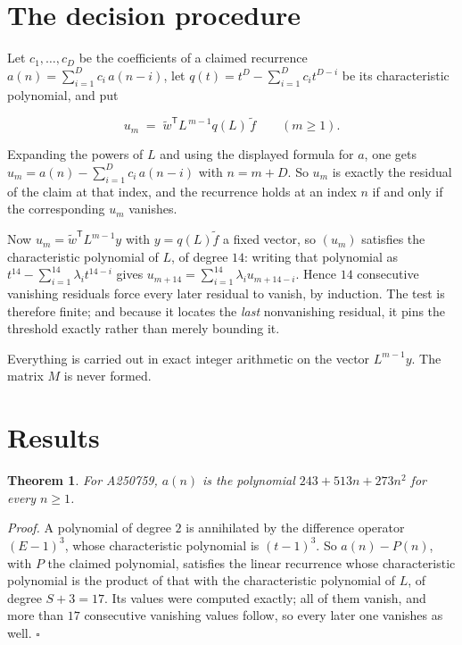 \documentclass[11pt]{article}
\newtheorem{theorem}{Theorem}
\theoremstyle{definition}
\begin{document}
\section{The decision procedure}

Let $c_1,\dots,c_D$ be the coefficients of a claimed recurrence $a(n) = \sum_{i=1}^{D} c_i\,a(n-i)$, let $q(t) = t^{D} - \sum_{i=1}^{D} c_i t^{D-i}$ be its characteristic polynomial, and put

\[u_m \;=\; \tilde w^{\mathsf T} L^{\,m-1} q(L)\,\tilde f \qquad (m \ge 1).\]

Expanding the powers of $L$ and using the displayed formula for $a$, one gets $u_m = a(n) - \sum_{i=1}^{D} c_i\,a(n-i)$ with $n = m + D$. So $u_m$ is exactly the residual of the claim at that index, and the recurrence holds at an index $n$ if and only if the corresponding $u_m$ vanishes.

Now $u_m = \tilde w^{\mathsf T} L^{m-1} y$ with $y = q(L)\tilde f$ a fixed vector, so $(u_m)$ satisfies the characteristic polynomial of $L$, of degree $14$: writing that polynomial as $t^{14} - \sum_{i=1}^{14} \lambda_i t^{14-i}$ gives $u_{m+14} = \sum_{i=1}^{14} \lambda_i u_{m+14-i}$. Hence $14$ consecutive vanishing residuals force every later residual to vanish, by induction. The test is therefore finite; and because it locates the {\itshape last} nonvanishing residual, it pins the threshold exactly rather than merely bounding it.

Everything is carried out in exact integer arithmetic on the vector $L^{m-1}y$. The matrix $M$ is never formed.

\section{Results}

\begin{theorem} For A250759, $a(n)$ is the polynomial $243 + 513n + 273n^{2}$ for every $n \ge 1$.\end{theorem}

{\itshape Proof.} A polynomial of degree $2$ is annihilated by the difference operator $(E-1)^{3}$, whose characteristic polynomial is $(t-1)^{3}$. So $a(n) - P(n)$, with $P$ the claimed polynomial, satisfies the linear recurrence whose characteristic polynomial is the product of that with the characteristic polynomial of $L$, of degree $S + 3 = 17$. Its values were computed exactly; all of them vanish, and more than $17$ consecutive vanishing values follow, so every later one vanishes as well. $\square$
\end{document}
